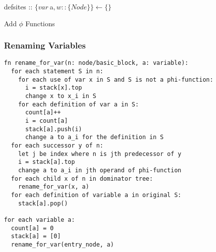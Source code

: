 \documentclass[8pt]{extarticle}
\begin{document}
\begin{multicols*}{2}
  \begin{algorithm}[H]
    defsites :: $\{var\ $a$, w ::\{Node\}\} \leftarrow \{\}$\\
    \caption{Add $\phi$ Functions\label{Algo_add_phi_functions}}
  \end{algorithm}  

  \vfill\null
  \columnbreak
    
  \subsubsection{Renaming Variables \cite{appelbook}}
\begin{verbatim}
fn rename_for_var(n: node/basic_block, a: variable):
  for each statement S in n:
    for each use of var x in S and S is not a phi-function:
      i = stack[x].top
      change x to x_i in S
    for each definition of var a in S:
      count[a]++
      i = count[a]
      stack[a].push(i)
      change a to a_i for the definition in S
  for each successor y of n:
    let j be index where n is jth predecessor of y
    i = stack[a].top
    change a to a_i in jth operand of phi-function
  for each child x of n in dominator tree:
    rename_for_var(x, a)
  for each definition of variable a in original S:
    stack[a].pop()

for each variable a:
  count[a] = 0
  stack[a] = [0]
  rename_for_var(entry_node, a)
\end{verbatim}

  \vfill\null
  \columnbreak
  

\end{multicols*}
\end{document}

